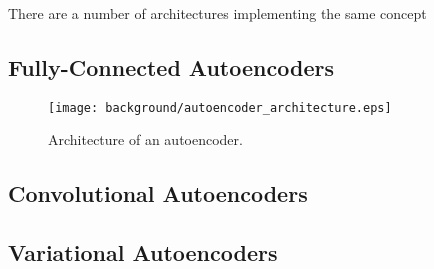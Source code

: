 There are a number of architectures implementing the same concept

\subsection{Fully-Connected Autoencoders}

\begin{figure}[h!]
\centering
\texttt{[image: background/autoencoder\_architecture.eps]}
\caption{Architecture of an autoencoder.}
\end{figure}

\subsection{Convolutional Autoencoders}

\subsection{Variational Autoencoders}